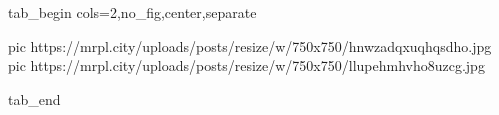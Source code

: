  
 
 
 
 


\ifcmt
  tab_begin cols=2,no_fig,center,separate

     pic https://mrpl.city/uploads/posts/resize/w/750x750/hnwzadqxuqhqsdho.jpg
		 pic https://mrpl.city/uploads/posts/resize/w/750x750/llupehmhvho8uzcg.jpg

  tab_end
\fi
